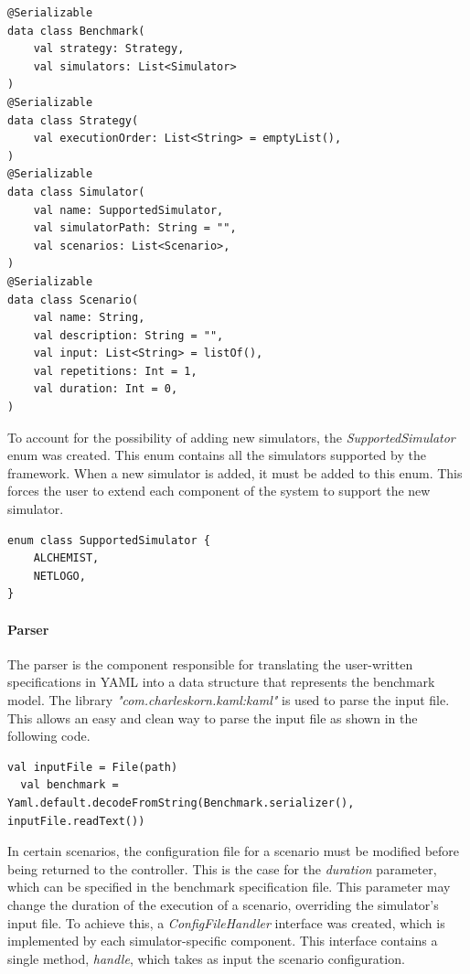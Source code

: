 \documentclass[12pt,a4paper,openright,twoside]{book}
\begin{document}
\lstset{style=my-kotlin}
\begin{lstlisting}[language=my-kotlin, caption={Benchmark model.}]
@Serializable
data class Benchmark(
    val strategy: Strategy,
    val simulators: List<Simulator>
)
@Serializable
data class Strategy(
    val executionOrder: List<String> = emptyList(),
)
@Serializable
data class Simulator(
    val name: SupportedSimulator,
    val simulatorPath: String = "",
    val scenarios: List<Scenario>,
)
@Serializable
data class Scenario(
    val name: String,
    val description: String = "",
    val input: List<String> = listOf(),
    val repetitions: Int = 1,
    val duration: Int = 0,
)
\end{lstlisting}

To account for the possibility of adding new simulators, the \emph{SupportedSimulator} enum was created.
This enum contains all the simulators supported by the framework. When a new simulator is added, it must be added to this enum.
This forces the user to extend each component of the system to support the new simulator.

\begin{lstlisting}[language=my-kotlin, caption={SupportedSimulator enum}]
  enum class SupportedSimulator {
    ALCHEMIST,
    NETLOGO,
}
\end{lstlisting}

\paragraph*{Parser}
The parser is the component responsible for translating the user-written specifications in YAML into a data structure that represents the benchmark model.
The library \emph{"com.charleskorn.kaml:kaml"} is used to parse the input file.
This allows an easy and clean way to parse the input file as shown in the following code.

\begin{lstlisting}[language=my-kotlin, caption={Parsing of the input file}]
  val inputFile = File(path)
  val benchmark = Yaml.default.decodeFromString(Benchmark.serializer(), inputFile.readText())
\end{lstlisting}

In certain scenarios, the configuration file for a scenario must be modified before being returned to the controller.
This is the case for the \emph{duration} parameter, which can be specified in the benchmark specification file.
This parameter may change the duration of the execution of a scenario, overriding the simulator's input file. 
To achieve this, a \emph{ConfigFileHandler} interface was created, which is implemented by each simulator-specific component.
This interface contains a single method, \emph{handle}, which takes as input the scenario configuration.
\end{document}
